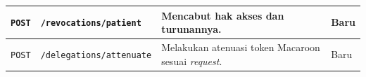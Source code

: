 {\begin{longtable}{|p{}|p{}|p{}|p{}|}
		\texttt{POST}   & \texttt{/revocations/\allowbreak patient}
		                & Mencabut hak akses dan turunannya.
		                & Baru                                                                                           \\ \hline

		\texttt{POST}   & \texttt{/delegations/\allowbreak attenuate}
		                & Melakukan atenuasi token Macaroon sesuai \textit{request}.
		                & Baru                                                                                           \\ \hline
	\end{longtable}
}
